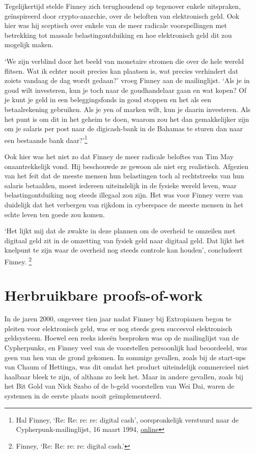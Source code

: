\documentclass[
  a5paper,
  smalldemyvopaper,11pt,twoside,onecolumn,openright,extrafontsizes]{memoir}
\begin{document}
Tegelijkertijd stelde Finney zich terughoudend op tegenover enkele
uitspraken, geïnspireerd door crypto-anarchie, over de beloften van
elektronisch geld. Ook hier was hij sceptisch over enkele van de meer
radicale voorspellingen met betrekking tot massale belastingontduiking
en hoe elektronisch geld dit zou mogelijk maken.

`We zijn verblind door het beeld van monetaire stromen die over de hele
wereld flitsen. Wat ik echter nooit precies kan plaatsen is, wat precies
verhindert dat zoiets vandaag de dag wordt gedaan?' vroeg Finney aan de
mailinglijst. `Als je in goud wilt investeren, kun je toch naar de
goudhandelaar gaan en wat kopen? Of je kunt je geld in een
beleggingsfonds in goud stoppen en het als een betaalrekening gebruiken.
Als je yen of marken wilt, kun je daarin investeren. Als het punt is om
dit in het geheim te doen, waarom zou het dan gemakkelijker zijn om je
salaris per post naar de digicash-bank in de Bahamas te sturen dan naar
een bestaande bank daar?'\footnote{Hal Finney, `Re: Re: re: re: digital
  cash', oorspronkelijk verstuurd naar de Cypherpunk-mailinglijst, 16
  maart 1994,
  \href{https://cypherpunks.venona.com/date/1994/03/msg00694.html}{online}}

Ook hier was het niet zo dat Finney de meer radicale beloftes van Tim
May onaantrekkelijk vond. Hij beschouwde ze gewoon als niet erg
realistisch. Afgezien van het feit dat de meeste mensen hun belastingen
toch al rechtstreeks van hun salaris betaalden, moest iedereen
uiteindelijk in de fysieke wereld leven, waar belastingontduiking nog
steeds illegaal zou zijn. Het was voor Finney verre van duidelijk dat
het verbergen van rijkdom in cyberspace de meeste mensen in het echte
leven ten goede zou komen.

`Het lijkt mij dat de zwakte in deze plannen om de overheid te omzeilen
met digitaal geld zit in de omzetting van fysiek geld naar digitaal
geld. Dat lijkt het knelpunt te zijn waar de overheid nog steeds
controle kan houden', concludeert Finney. \footnote{Finney, `Re: Re: re:
  re: digital cash.'}

\section{Herbruikbare proofs-of-work}\label{herbruikbare-proofs-of-work}

In de jaren 2000, ongeveer tien jaar nadat Finney bij Extropianen begon
te pleiten voor elektronisch geld, was er nog steeds geen succesvol
elektronisch geldsysteem. Hoewel een reeks ideeën besproken was op de
mailinglijst van de Cypherpunks, en Finney veel van de voorstellen
persoonlijk had beoordeeld, was geen van hen van de grond gekomen. In
sommige gevallen, zoals bij de start-ups van Chaum of Hettinga, was dit
omdat het product uiteindelijk commercieel niet haalbaar bleek te zijn,
of althans zo leek het. Maar in andere gevallen, zoals bij het Bit Gold
van Nick Szabo of de b-geld voorstellen van Wei Dai, waren de systemen
in de eerste plaats nooit geïmplementeerd.
\end{document}
